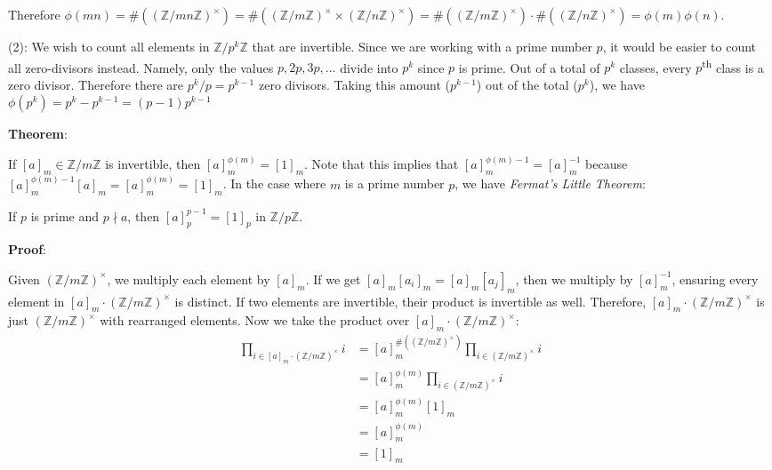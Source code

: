 \documentclass{article}
\begin{document}
\begin{multicols*}{2}
Therefore $\phi(mn) = \#((\mathbb{Z}/mn\mathbb{Z})^\times) = \#((\mathbb{Z}/m\mathbb{Z})^\times \times (\mathbb{Z}/n\mathbb{Z})^\times) = \#((\mathbb{Z}/m\mathbb{Z})^\times) \cdot \#((\mathbb{Z}/n\mathbb{Z})^\times) = \phi(m)\phi(n)$.

(2): We wish to count all elements in $\mathbb{Z}/p^k\mathbb{Z}$ that are invertible. Since we are working with a prime number $p$, it would be easier to count all zero-divisors instead. Namely, only the values $p,2p,3p,...$ divide into $p^k$ since $p$ is prime. Out of a total of $p^k$ classes, every $p$\textsuperscript{th} class is a zero divisor. Therefore there are $p^{k}/p = p^{k-1}$ zero divisors. Taking this amount ($p^{k-1}$) out of the total ($p^k$), we have $\phi(p^k) = p^k - p^{k-1} = (p-1)p^{k-1}$

\textbf{Theorem}:

If $[a]_m \in \mathbb{Z}/m\mathbb{Z}$ is invertible, then $[a]_m^{\phi(m)} = [1]_m$. Note that this implies that $[a]_m^{\phi(m)-1} = [a]_m^{-1}$ because $[a]_m^{\phi(m)-1} [a]_m = [a]_m^{\phi(m)} = [1]_m$. In the case where $m$ is a prime number $p$, we have \textit{Fermat's Little Theorem}:

If $p$ is prime and $p \nmid a$, then $[a]_p^{p-1} = [1]_p$ in $\mathbb{Z}/p\mathbb{Z}$.

\textbf{Proof}:


Given $(\mathbb{Z}/m\mathbb{Z})^\times$, we multiply each element by $[a]_m$. If we get $[a]_m[a_i]_m = [a]_m[a_j]_m$, then we multiply by $[a]_m^{-1}$, ensuring every element in $[a]_m \cdot(\mathbb{Z}/m\mathbb{Z})^\times$ is distinct. If two elements are invertible, their product is invertible as well. Therefore, $[a]_m \cdot(\mathbb{Z}/m\mathbb{Z})^\times$ is just $(\mathbb{Z}/m\mathbb{Z})^\times$ with rearranged elements. Now we take the product over $[a]_m \cdot(\mathbb{Z}/m\mathbb{Z})^\times$:\[\begin{aligned}
\prod_{i \in [a]_m \cdot(\mathbb{Z}/m\mathbb{Z})^\times} i &= [a]_m ^{\#((\mathbb{Z}/m\mathbb{Z})^\times)} \prod_{i \in (\mathbb{Z}/m\mathbb{Z})^\times} i \\
&= [a]_m ^{\phi(m)} \prod_{i \in (\mathbb{Z}/m\mathbb{Z})^\times} i\\
&= [a]_m ^{\phi(m)} [1]_m \\
&= [a]_m ^{\phi(m)} \\
&= [1]_m
\end{aligned}\]


\end{multicols*}
\end{document}
